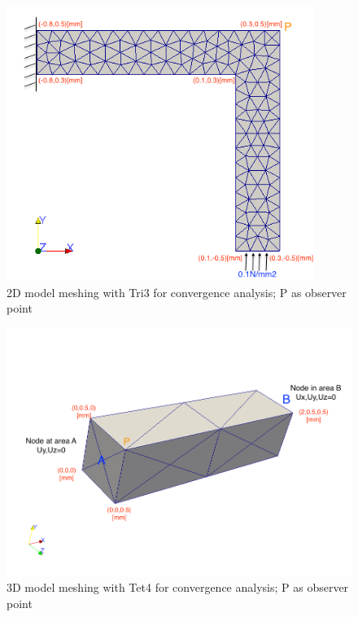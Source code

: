 \begin{figure}[htbp]
	\begin{center}	
		\includegraphics[width=10cm,clip]{Convergence2D.png} 			
		\caption{2D model meshing with Tri3 for convergence analysis; P as observer point} \label{fig: Convergence2D}
	\end{center}
\end{figure}

\begin{figure}[htbp]
	\begin{center}	
		\includegraphics[width=14cm,clip]{Convergence3D.png} 			
		\caption{3D model meshing with Tet4 for convergence analysis; P as observer point} \label{fig: Convergence3D}
	\end{center}
\end{figure}

